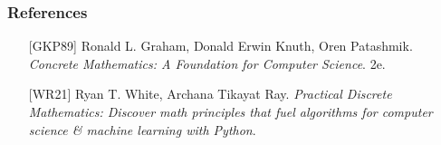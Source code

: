\documentclass{beamer}
\begin{document}
\begin{frame}
	\frametitle{References}
	\begin{itemize}
		\item[][GKP89] {\sc Ronald L. Graham, Donald Erwin Knuth, Oren Patashmik}. {\it Concrete Mathematics: A Foundation for Computer Science}. 2e.
		
		\item[][WR21] {\sc Ryan T. White, Archana Tikayat Ray}. {\it Practical Discrete Mathematics: Discover math principles that fuel algorithms for computer science \& machine learning with Python}.		
	\end{itemize}
	
\end{frame}
\end{document}
